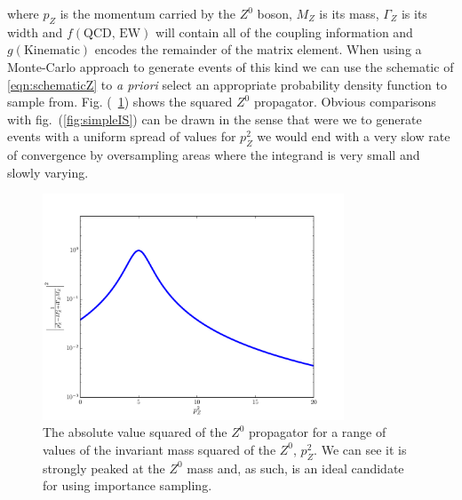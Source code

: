   	where $p_Z$ is the momentum carried by the $Z^0$ boson, $M_Z$ is its mass, $\Gamma_Z$ is its width and $f(\text{QCD, EW})$ will
  	contain all of the coupling information and $g(\text{Kinematic})$ encodes the remainder of the matrix element.  When using a
  	Monte-Carlo approach to generate events of this kind we can use the schematic of \ref{eqn:schematicZ} to \emph{a priori} select
  	an appropriate probability density function to sample from.  Fig. (~\ref{fig:breitWigner}) shows the squared $Z^0$ propagator.
  	Obvious comparisons with fig.~(\ref{fig:simpleIS}) can be drawn in the sense that were we to generate events with a uniform spread
  	of values for $p_Z^2$ we would end with a very slow rate of convergence by oversampling areas where the integrand is very small and slowly varying.

	\begin{figure}[htp]
		\centering
		\includegraphics[width=0.8\textwidth, height=0.6\textwidth]{breitWigner}
		\caption{The absolute value squared of the $Z^0$ propagator for a range of values of the invariant mass squared of the
		$Z^0$, $p_Z^2$.  We can see it is strongly peaked at the $Z^0$ mass and, as such, is an ideal candidate for using importance sampling.}
		\label{fig:breitWigner}
  	\end{figure}

